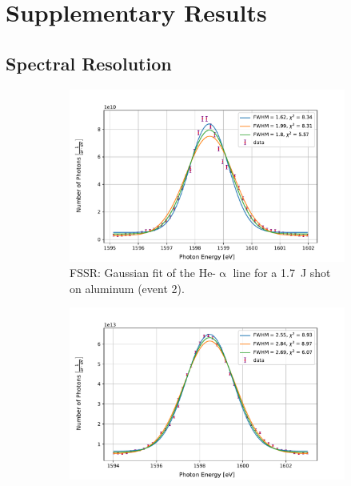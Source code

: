 \chapter{Supplementary Results}
\label{appendix: supplementary results}


\section{Spectral Resolution}
\label{appendix: spectral resolution}

\begin{figure} [H]
	\centering
	\begin{subfigure}[t]{0.49\textwidth}
		\centering
		\includegraphics[width=\textwidth]{Data_Analysis/resolution/peak_of_Al_event_2_on_FSSR.pdf}
		\caption{FSSR: Gaussian fit of the He-$\upalpha$ line for a \SI{1.7}{\joule} shot on aluminum (event 2).}
		\label{}
	\end{subfigure}%
	\hfill
	\begin{subfigure}[t]{0.49\textwidth}
		\centering
		\includegraphics[width=\textwidth]{Data_Analysis/resolution/peak_of_Al_(thick)_event_16_on_SUCC.pdf}

\end{subfigure}
\end{figure}
